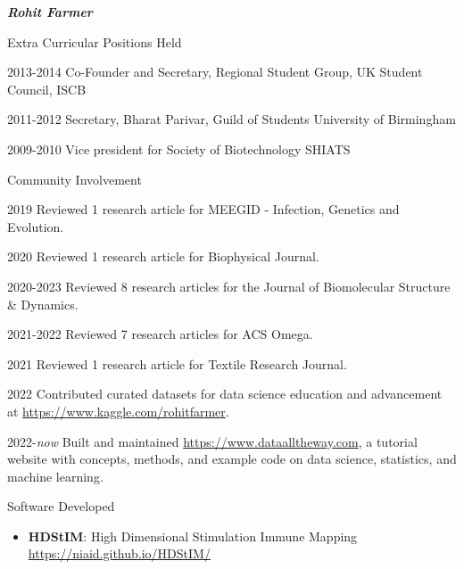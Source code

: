 \documentclass[10pt]{article}
\begin{document}
\begin{cv}{\huge \it \bfseries Rohit Farmer}
\vskip3pt
\begin{cvlist}{Extra Curricular Positions Held}
	\item[2013-2014] Co-Founder and Secretary, Regional Student Group, UK \hfill Student Council, ISCB
	\item[2011-2012] Secretary, Bharat Parivar, Guild of Students \hfill University of Birmingham
	\item[2009-2010] Vice president for Society of Biotechnology \hfill SHIATS
\end{cvlist}

\vskip3pt
\begin{cvlist}{Community Involvement}
        \item[2019] Reviewed 1 research article for MEEGID - Infection, Genetics and Evolution.
        \item[2020] Reviewed 1 research article for Biophysical Journal.
        \item[2020-2023] Reviewed 8 research articles for the Journal of Biomolecular Structure \& Dynamics.
        \item[2021-2022] Reviewed 7 research articles for ACS Omega.
        \item[2021] Reviewed 1 research article for Textile Research Journal.
        \item[2022] Contributed curated datasets for data science education and advancement at \url{https://www.kaggle.com/rohitfarmer}.
        \item[2022-\emph{now}] Built and maintained \url{https://www.dataalltheway.com}, a tutorial website with concepts, methods, and example code on data science, statistics, and machine learning.
\end{cvlist}

\renewenvironment{thebibliography}[1]{
\setlength{\topsep}{0em}
\setlength{\labelsep}{.5em}
\begin{etaremune}{
\setlength{\itemsep}{0.5em}}
}{\end{etaremune}}
\renewcommand{\bibitem}[1]{\item}

\setlength{\cvlabelsep}{0mm}
\setlength{\cvlabelwidth}{0mm}
\renewcommand{\labelitemi}{}

\vskip3pt
\begin{cvlist}{Software Developed}
	\item {\begin{itemize}
			\item{\bf HDStIM}: High Dimensional Stimulation Immune Mapping \url{https://niaid.github.io/HDStIM/}
                \end{itemize}}
\end{cvlist}


\end{cv}
\end{document}
